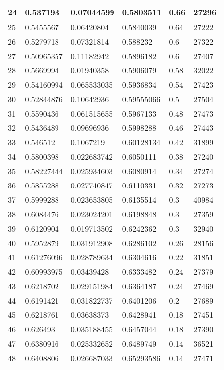 \begin{longtable}{|l|l|l|l|l|l|}
24 & 0.537193 & 0.07044599 & 0.5803511 & 0.66 & 27296 \\ \hline 
25 & 0.5455567 & 0.06420804 & 0.5840039 & 0.64 & 27222 \\ \hline 
26 & 0.5279718 & 0.07321814 & 0.588232 & 0.6 & 27322 \\ \hline 
27 & 0.50965357 & 0.11182942 & 0.5896182 & 0.6 & 27407 \\ \hline 
28 & 0.5669994 & 0.01940358 & 0.5906079 & 0.58 & 32022 \\ \hline 
29 & 0.54160994 & 0.065533035 & 0.5936834 & 0.54 & 27423 \\ \hline 
30 & 0.52844876 & 0.10642936 & 0.59555066 & 0.5 & 27504 \\ \hline 
31 & 0.5590436 & 0.061515655 & 0.5967133 & 0.48 & 27473 \\ \hline 
32 & 0.5436489 & 0.09696936 & 0.5998288 & 0.46 & 27443 \\ \hline 
33 & 0.546512 & 0.1067219 & 0.60128134 & 0.42 & 31899 \\ \hline 
34 & 0.5800398 & 0.022683742 & 0.6050111 & 0.38 & 27240 \\ \hline 
35 & 0.58227444 & 0.025934603 & 0.6080914 & 0.34 & 27274 \\ \hline 
36 & 0.5855288 & 0.027740847 & 0.6110331 & 0.32 & 27273 \\ \hline 
37 & 0.5999288 & 0.023653805 & 0.6135514 & 0.3 & 40984 \\ \hline 
38 & 0.6084476 & 0.023024201 & 0.6198848 & 0.3 & 27359 \\ \hline 
39 & 0.6120904 & 0.019713502 & 0.6242362 & 0.3 & 32940 \\ \hline 
40 & 0.5952879 & 0.031912908 & 0.6286102 & 0.26 & 28156 \\ \hline 
41 & 0.61276096 & 0.028789634 & 0.6304616 & 0.22 & 31851 \\ \hline 
42 & 0.60993975 & 0.03439428 & 0.6333482 & 0.24 & 27379 \\ \hline 
43 & 0.6218702 & 0.029151984 & 0.6364187 & 0.24 & 27469 \\ \hline 
44 & 0.6191421 & 0.031822737 & 0.6401206 & 0.2 & 27689 \\ \hline 
45 & 0.6218761 & 0.03638373 & 0.6428941 & 0.18 & 27451 \\ \hline 
46 & 0.626493 & 0.035188455 & 0.6457044 & 0.18 & 27390 \\ \hline 
47 & 0.6380916 & 0.025332652 & 0.6489749 & 0.14 & 36521 \\ \hline 
48 & 0.6408806 & 0.026687033 & 0.65293586 & 0.14 & 27471 \\ \hline 

\end{longtable}
